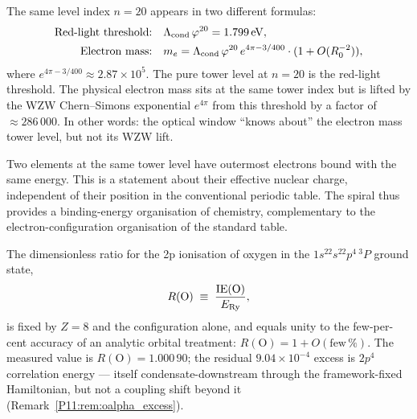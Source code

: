 \begin{remark}
\label{P11:rem:level20_dual_use}
The same level index $n=20$ appears in two different formulas:
\begin{align}
  \text{Red-light threshold:} &\quad \Lambda_{\mathrm{cond}}\,\varphi^{20} = 1.799\,\mathrm{eV}, \\
  \text{Electron mass:} &\quad m_e = \Lambda_{\mathrm{cond}}\,\varphi^{20}\,e^{4\pi-3/400}\cdot(1+O(R_0^{-2})),
\end{align}
where $e^{4\pi-3/400} \approx 2.87\times10^5$.
The pure tower level at $n=20$ is the red-light threshold.
The physical electron mass sits at the same tower index but is lifted
by the WZW Chern--Simons exponential $e^{4\pi}$ from this threshold
by a factor of $\approx 286\,000$.
In other words: the optical window ``knows about'' the electron mass
tower level, but not its WZW lift.
\end{remark}

\begin{remark}
\label{P11:rem:spiral_measures}
Two elements at the same tower level have outermost electrons
bound with the same energy.  This is a statement about their
effective nuclear charge, independent of their position in
the conventional periodic table.  The spiral thus provides a
binding-energy organisation of chemistry, complementary to
the electron-configuration organisation of the standard table.
\end{remark}

\begin{proposition}
\label{P11:prop:R_equals_1}
The dimensionless ratio for the 2p ionisation of oxygen in the
$1s^22s^22p^4\,{}^3P$ ground state,
\begin{equation}
  R(\mathrm{O}) \;\equiv\; \frac{\mathrm{IE}(\mathrm{O})}{E_{\mathrm{Ry}}},
  \label{P11:eq:R_equals_1}
\end{equation}
is fixed by $Z=8$ and the configuration alone, and equals unity to the
few-per-cent accuracy of an analytic orbital treatment:
$\boxed{R(\mathrm{O}) = 1 + O(\text{few}\,\%)}$.  The measured value is
$R(\mathrm{O}) = 1.000\,90$; the residual $9.04\times10^{-4}$ excess is
$2p^4$ correlation energy --- itself condensate-downstream through the
framework-fixed Hamiltonian, but not a coupling shift beyond it
(Remark~\ref{P11:rem:oalpha_excess}).
\end{proposition}

